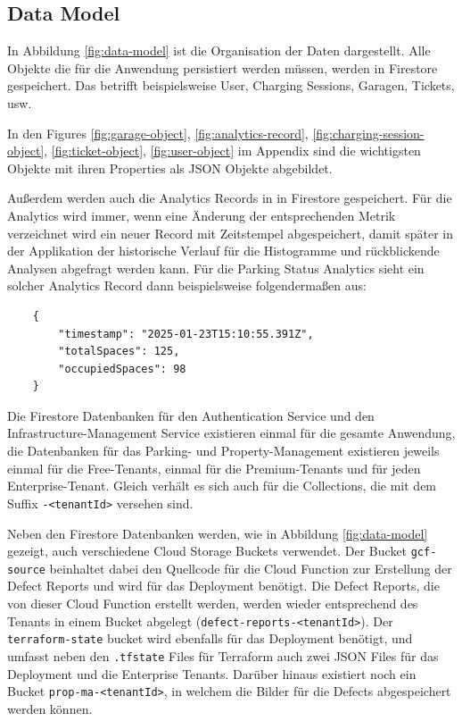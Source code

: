 \subsection{Data Model}

In Abbildung \ref{fig:data-model} ist die Organisation der Daten dargestellt. Alle Objekte die für die Anwendung persistiert werden müssen, werden in Firestore gespeichert. Das betrifft beispielsweise User, Charging Sessions, Garagen, Tickets, usw. 

In den Figures \ref{fig:garage-object}, \ref{fig:analytics-record}, \ref{fig:charging-session-object}, \ref{fig:ticket-object}, \ref{fig:user-object} im Appendix sind die wichtigsten Objekte mit ihren Properties als JSON Objekte abgebildet.


Außerdem werden auch die Analytics Records in in Firestore gespeichert. Für die Analytics wird immer, wenn eine Änderung der entsprechenden Metrik verzeichnet wird ein neuer Record mit Zeitstempel abgespeichert, damit später in der Applikation der historische Verlauf für die Histogramme und rückblickende Analysen abgefragt werden kann. Für die Parking Status Analytics sieht ein solcher Analytics Record dann beispielsweise folgendermaßen aus:

\begin{verbatim}
    {
        "timestamp": "2025-01-23T15:10:55.391Z",
        "totalSpaces": 125,
        "occupiedSpaces": 98
    }
\end{verbatim}

Die Firestore Datenbanken für den Authentication Service und den Infrastructure-Management Service existieren einmal für die gesamte Anwendung, die Datenbanken für das Parking- und Property-Management existieren jeweils einmal für die Free-Tenants, einmal für die Premium-Tenants und für jeden Enterprise-Tenant. Gleich verhält es sich auch für die Collections, die mit dem Suffix \verb|-<tenantId>| versehen sind.

Neben den Firestore Datenbanken werden, wie in Abbildung \ref{fig:data-model} gezeigt, auch verschiedene Cloud Storage Buckets verwendet. Der Bucket \verb|gcf-source| beinhaltet dabei den Quellcode für die Cloud Function zur Erstellung der Defect Reports und wird für das Deployment benötigt. Die Defect Reports, die von dieser Cloud Function erstellt werden, werden wieder entsprechend des Tenants in einem Bucket abgelegt (\verb|defect-reports-<tenantId>|). Der \verb|terraform-state| bucket wird ebenfalls für das Deployment benötigt, und umfasst neben den \verb|.tfstate| Files für Terraform auch zwei JSON Files für das Deployment und die Enterprise Tenants.
Darüber hinaus existiert noch ein Bucket \verb|prop-ma-<tenantId>|, in welchem die Bilder für die Defects abgespeichert werden können.

